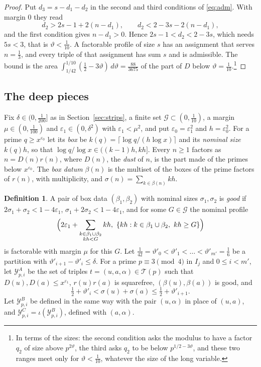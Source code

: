 \documentclass[aps,prd,twocolumn,superscriptaddress,nofootinbib,longbibliography,floatfix,showkeys,nobalancelastpage,amsmath,amssymb,10pt]{revtex4-2}
\theoremstyle{plain}
\theoremstyle{definition}
\newtheorem{definition}[theorem]{Definition}
\theoremstyle{plain}
\newcommand{\eps}{\varepsilon}
\newcommand{\Tp}{\mathcal{T}}
\begin{document}
\begin{proof}
Put $d_3=s-d_1-d_2$ in the second and third conditions of \eqref{eq:adm}. With margin $0$ they read
\[
d_2>2s-1+2(n-d_1),\qquad d_2<2-3s-2(n-d_1),
\]
and the first condition gives $n-d_1>0$. Hence $2s-1<d_2<2-3s$, which needs $5s<3$, that is $\vartheta<\frac1{10}$. A factorable profile of size $s$ has an assignment that serves $n=\frac13$, and every triple of that assignment has sum $s$ and is admissible. The bound is the area $\int_{1/42}^{1/10}(\frac12-3\vartheta)\,d\vartheta=\frac{88}{3675}$ of the part of $D$ below $\vartheta=\frac1{10}$.\footnote{In terms of the sizes: the second condition asks the modulus to have a factor $q_2$ of size above $p^{2\vartheta}$, the third asks $q_2$ to be below $p^{1/2-3\vartheta}$, and these two ranges meet only for $\vartheta<\frac1{10}$, whatever the size of the long variable.}
\end{proof}

\subsection{The deep pieces}

Fix $\delta\in(0,\frac1{200}]$ as in Section~\ref{sec:strips}, a finite set $\mathcal G\subset(0,\frac1{10})$, a margin $\mu\in(0,\frac1{100})$ and $\eps_1\in(0,\delta^2)$ with $\eps_1<\mu^2$, and put $\eps_0=\eps_1^2$ and $h=\eps_0^2$. For a prime $q\ge x^{\eps_0}$ let its \emph{box} be $k(q)=\lceil\log q/(h\log x)\rceil$ and its \emph{nominal size} $k(q)h$, so that $\log q/\log x\in((k-1)h,kh]$. Every $n\ge1$ factors as $n=D(n)r(n)$, where $D(n)$, the \emph{dust} of $n$, is the part made of the primes below $x^{\eps_0}$. The \emph{box datum} $\beta(n)$ is the multiset of the boxes of the prime factors of $r(n)$, with multiplicity, and $\sigma(n)=\sum_{k\in\beta(n)}kh$.

\begin{definition}\label{def:deep}
A pair of box data $(\beta_1,\beta_2)$ with nominal sizes $\sigma_1,\sigma_2$ is \emph{good} if $2\sigma_1+\sigma_2<1-4\eps_1$, $\sigma_1+2\sigma_2<1-4\eps_1$, and for some $G\in\mathcal G$ the nominal profile
\[
\Bigl(2\eps_1+\sum_{\substack{k\in\beta_1\cup\beta_2\\kh<G}}kh,\ \{kh:k\in\beta_1\cup\beta_2,\ kh\ge G\}\Bigr)
\]
is factorable with margin $\mu$ for this $G$. Let $\frac1{42}=\vartheta'_0<\vartheta'_1<\dots<\vartheta'_{m'}=\frac16$ be a partition with $\vartheta'_{i+1}-\vartheta'_i\le\delta$. For a prime $p\equiv3\pmod4$ in $I_j$ and $0\le i<m'$, let $\mathcal Y^A_{p,i}$ be the set of triples $t=(u,a,\alpha)\in\Tp(p)$ such that $D(u),D(a)\le x^{\eps_1}$, $r(u)r(a)$ is squarefree, $(\beta(u),\beta(a))$ is good, and
\[
\tfrac12+\vartheta'_i<\sigma(u)+\sigma(a)\le\tfrac12+\vartheta'_{i+1}.
\]
Let $\mathcal Y^B_{p,i}$ be defined in the same way with the pair $(u,\alpha)$ in place of $(u,a)$, and $\mathcal Y^C_{p,i}=\iota(\mathcal Y^B_{p,i})$, defined with $(a,\alpha)$.
\end{definition}
\end{document}

